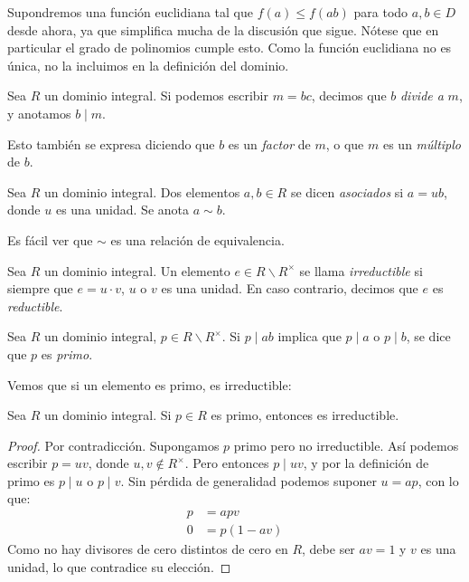   Supondremos una función euclidiana
  tal que \(f(a) \le f(a b)\) para todo \(a, b \in D\)
  desde ahora,
  ya que simplifica mucha de la discusión que sigue.
  Nótese que en particular el grado de polinomios cumple esto.
  Como la función euclidiana no es única,
  no la incluimos en la definición del dominio.
  \begin{definition}
    Sea \(R\) un dominio integral.
    Si podemos escribir \(m = b c\),
    decimos que \(b\) \emph{divide a} \(m\),
    y anotamos \(b \mid m\).
  \end{definition}
  Esto también se expresa
  diciendo que \(b\) es un \emph{factor} de \(m\),
  o que \(m\) es un \emph{múltiplo} de \(b\).
  \begin{definition}
    Sea \(R\) un dominio integral.
    Dos elementos \(a, b \in R\) se dicen \emph{asociados}
    si \(a = u b\),
    donde \(u\) es una unidad.
    Se anota \(a \sim b\).
  \end{definition}
  Es fácil ver que \(\sim\) es una relación de equivalencia.
  \begin{definition}
    Sea \(R\) un dominio integral.
    Un elemento \(e \in R \smallsetminus R^\times\)
    se llama \emph{irreductible} si siempre que
    \(e = u \cdot v\),
    \(u\) o \(v\) es una unidad.
    En caso contrario,
    decimos que \(e\) es \emph{reductible}.
  \end{definition}
  \begin{definition}
    Sea \(R\) un dominio integral,
    \(p \in R \smallsetminus R^\times\).
    Si \(p \mid a b\) implica que \(p \mid a\) o \(p \mid b\),
    se dice que \(p\) es \emph{primo}.
  \end{definition}
  Vemos que si un elemento es primo,
  es irreductible:
  \begin{lemma}
    \label{lem:prime=>irreducible}
    Sea \(R\) un dominio integral.
    Si \(p \in R\) es primo,
    entonces es irreductible.
  \end{lemma}
  \begin{proof}
    Por contradicción.
    Supongamos \(p\) primo pero no irreductible.
    Así podemos escribir \(p = u v\),
    donde \(u, v \notin R^\times\).
    Pero entonces \(p \mid u v\),
    y por la definición de primo
    es \(p \mid u\) o \(p \mid v\).
    Sin pérdida de generalidad
    podemos suponer \(u = a p\),
    con lo que:
    \begin{align*}
      p
	&= a p v \\
      0
	&= p (1 - a v)
    \end{align*}
    Como no hay divisores de cero distintos de cero en \(R\),
    debe ser \(a v = 1\)
    y \(v\) es una unidad,
    lo que contradice su elección.
  \end{proof}

